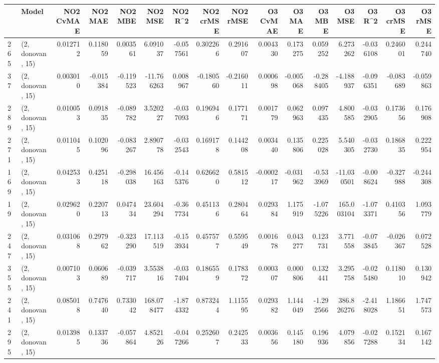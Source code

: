 \begin{tabular}{llrrrrrrrrrrrrrr}
\toprule
{} &             Model &  NO2 CvMAE &   NO2 MAE &   NO2 MBE &     NO2 MSE &   NO2 R\textasciicircum2 &  NO2 crMSE &  NO2 rMSE &  O3 CvMAE &    O3 MAE &    O3 MBE &       O3 MSE &    O3 R\textasciicircum2 &  O3 crMSE &   O3 rMSE \\
\midrule
265 &  (2, donovan, 15) &   0.012712 &  0.118059 &  0.003561 &    6.091037 & -0.057561 &   0.302266 &  0.291607 &  0.004330 &  0.173275 &  0.059252 &     6.273262 & -0.036108 &  0.246001 &  0.244740 \\
37  &  (2, donovan, 15) &   0.003010 & -0.015384 & -0.119523 &  -11.766263 &  0.008967 &  -0.180560 & -0.216011 &  0.000698 & -0.005068 & -0.288405 &    -4.188937 & -0.096351 & -0.083689 & -0.059863 \\
289 &  (2, donovan, 15) &   0.010053 &  0.091835 & -0.089782 &    3.520227 & -0.037093 &   0.196946 &  0.177171 &  0.001779 &  0.062963 &  0.097435 &     4.800585 & -0.032905 &  0.173656 &  0.176908 \\
271 &  (2, donovan, 15) &   0.011045 &  0.102096 & -0.083267 &    2.890778 & -0.032543 &   0.169178 &  0.144208 &  0.003440 &  0.135806 &  0.225028 &     5.540305 & -0.032730 &  0.186835 &  0.222954 \\
169 &  (2, donovan, 15) &   0.042533 &  0.425118 & -0.298038 &   16.456163 & -0.145376 &   0.626620 &  0.581512 & -0.000217 & -0.031962 & -0.533969 &   -11.030501 & -0.008624 & -0.327988 & -0.244308 \\
19  &  (2, donovan, 15) &   0.029620 &  0.220713 &  0.047434 &   23.604294 & -0.367734 &   0.451136 &  0.280464 &  0.029384 &  1.175919 & -1.075226 &   165.003104 & -1.073371 &  0.410356 &  1.093779 \\
247 &  (2, donovan, 15) &   0.031068 &  0.297962 & -0.323290 &   17.113519 & -0.153934 &   0.457577 &  0.559549 &  0.001678 &  0.043277 &  0.123731 &     3.771558 & -0.073845 & -0.026367 &  0.072528 \\
355 &  (2, donovan, 15) &   0.007103 &  0.060689 & -0.039717 &    3.553816 & -0.037404 &   0.186559 &  0.178372 &  0.000307 &  0.000806 &  0.132441 &     3.295758 & -0.025480 &  0.118010 &  0.130942 \\
241 &  (2, donovan, 15) &   0.085018 &  0.747640 &  0.733042 &  168.078477 & -1.874332 &   0.873244 &  1.115595 &  0.029382 &  1.144049 & -1.292566 &   386.826276 & -2.418028 &  1.186651 &  1.747573 \\
295 &  (2, donovan, 15) &   0.013985 &  0.133736 & -0.057864 &    4.852126 & -0.047266 &   0.252607 &  0.242533 &  0.003656 &  0.145180 &  0.196936 &     4.079856 & -0.027288 &  0.152134 &  0.167142 \\

\end{tabular}
